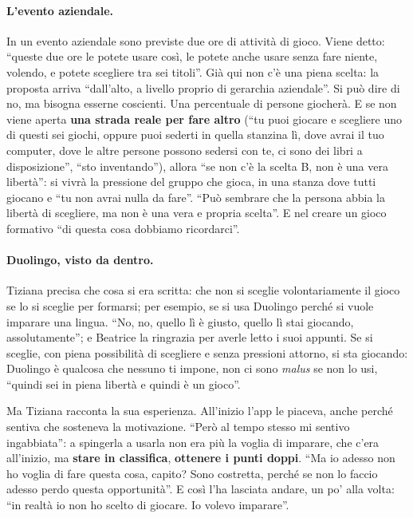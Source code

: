 \paragraph{L'evento aziendale.} In un evento aziendale sono previste due ore di
attività di gioco. Viene detto: ``queste due ore le potete usare così, le potete anche
usare senza fare niente, volendo, e potete scegliere tra sei titoli''. Già qui non c'è
una piena scelta: la proposta arriva ``dall'alto, a livello proprio di gerarchia
aziendale''. Si può dire di no, ma bisogna esserne coscienti. Una percentuale di
persone giocherà. E se non viene aperta \textbf{una strada reale per fare altro} (``tu
puoi giocare e scegliere uno di questi sei giochi, oppure puoi sederti in quella
stanzina lì, dove avrai il tuo computer, dove le altre persone possono sedersi con te,
ci sono dei libri a disposizione'', ``sto inventando''), allora ``se non c'è la scelta
B, non è una vera libertà'': si vivrà la pressione del gruppo che gioca, in una stanza
dove tutti giocano e ``tu non avrai nulla da fare''. ``Può sembrare che la persona abbia
la libertà di scegliere, ma non è una vera e propria scelta''. E nel creare un gioco
formativo ``di questa cosa dobbiamo ricordarci''.

\paragraph{Duolingo, visto da dentro.} Tiziana precisa che cosa si era scritta: che non
si sceglie volontariamente il gioco se lo si sceglie per formarsi; per esempio, se si
usa Duolingo perché si vuole imparare una lingua. ``No, no, quello lì è giusto, quello
lì stai giocando, assolutamente''; e Beatrice la ringrazia per averle letto i suoi
appunti. Se si sceglie, con piena possibilità di scegliere e senza pressioni attorno, si
sta giocando: Duolingo è qualcosa che nessuno ti impone, non ci sono \emph{malus} se
non lo usi, ``quindi sei in piena libertà e quindi è un gioco''.

Ma Tiziana racconta la sua esperienza. All'inizio l'app le piaceva, anche perché
sentiva che sosteneva la motivazione. ``Però al tempo stesso mi sentivo
ingabbiata'': a spingerla a usarla non era più la voglia di imparare, che c'era
all'inizio, ma \textbf{stare in classifica}, \textbf{ottenere i punti doppi}. ``Ma io
adesso non ho voglia di fare questa cosa, capito? Sono costretta, perché se non lo
faccio adesso perdo questa opportunità''. E così l'ha lasciata andare, un po' alla
volta: ``in realtà io non ho scelto di giocare. Io volevo imparare''.

